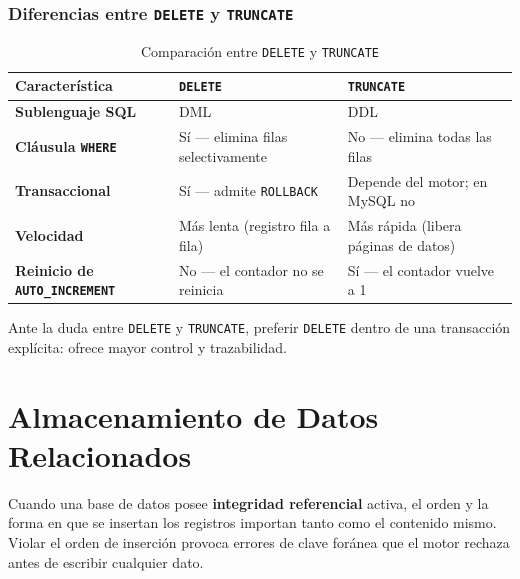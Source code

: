 \documentclass[12pt, a4paper]{article}
\begin{document}
	\subsubsection{Diferencias entre \texttt{DELETE} y \texttt{TRUNCATE}}
	
	\begin{table}[H]
		\centering
		\caption{Comparación entre \texttt{DELETE} y \texttt{TRUNCATE}}
		\renewcommand{\arraystretch}{1.3}
		\begin{tabularx}{\textwidth}{>{\bfseries}l X X}
			\toprule
			\textbf{Característica}     & \textbf{\texttt{DELETE}}                        & \textbf{\texttt{TRUNCATE}}                   \\
			\midrule
			Sublenguaje SQL             & DML                                             & DDL                                          \\
			Cláusula \texttt{WHERE}     & Sí — elimina filas selectivamente               & No — elimina todas las filas                 \\
			Transaccional               & Sí — admite \texttt{ROLLBACK}                   & Depende del motor; en MySQL no               \\
			Velocidad                   & Más lenta (registro fila a fila)                & Más rápida (libera páginas de datos)         \\
			Reinicio de \texttt{AUTO\_INCREMENT} & No — el contador no se reinicia       & Sí — el contador vuelve a 1                  \\
			\bottomrule
		\end{tabularx}
	\end{table}
	
	\begin{nota}
		Ante la duda entre \texttt{DELETE} y \texttt{TRUNCATE}, preferir
		\texttt{DELETE} dentro de una transacción explícita: ofrece mayor control y
		trazabilidad.
	\end{nota}
	
	\newpage
	\section{Almacenamiento de Datos Relacionados}
	
	Cuando una base de datos posee \textbf{integridad referencial} activa, el orden
	y la forma en que se insertan los registros importan tanto como el contenido
	mismo. Violar el orden de inserción provoca errores de clave foránea que el
	motor rechaza antes de escribir cualquier dato.
	
\end{document}

